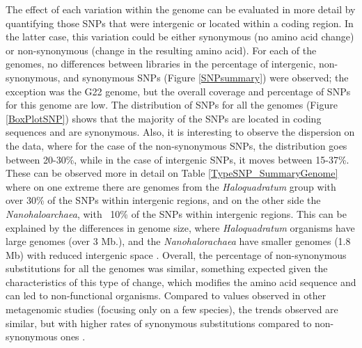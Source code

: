 The effect of each variation within the genome can be evaluated in more detail by quantifying those SNPs that were intergenic or located within a coding region. In the latter case, this variation could be either synonymous (no amino acid change) or non-synonymous (change in the resulting amino acid). For each of the genomes, no differences between libraries in the percentage of intergenic, non-synonymous, and synonymous SNPs (Figure \ref{SNPsummary}) were observed; the exception was the G22 genome, but the overall coverage and percentage of SNPs for this genome are low. The distribution of SNPs for all the genomes (Figure \ref{BoxPlotSNP}) shows that the majority of the SNPs are located in coding sequences and are synonymous. Also, it is interesting to observe the dispersion on the data, where for the case of the non-synonymous SNPs, the distribution goes between 20-30\%, while in the case of intergenic SNPs, it moves between 15-37\%. These can be observed more in detail on Table \ref{TypeSNP_SummaryGenome} where on one extreme there are genomes from the \textit{Haloquadratum} group with over 30\% of the SNPs within intergenic regions, and on the other side the \textit{Nanohaloarchaea}, with ~10\% of the SNPs within intergenic regions. This can be explained by the differences in genome size, where \textit{Haloquadratum} organisms have large genomes (over 3 Mb.), and the \textit{Nanohalorachaea} have smaller genomes (1.8 Mb) with reduced intergenic space \cite{Narasingarao:2012kp,Podell:2013kx}. Overall, the percentage of non-synonymous substitutions for all the genomes was similar, something expected given the characteristics of this type of change, which modifies the amino acid sequence and can led to non-functional organisms. Compared to values observed in other metagenomic studies (focusing only on a few species), the trends observed are similar, but with higher rates of synonymous substitutions compared to non-synonymous ones \cite{Simmons:2008by}.

